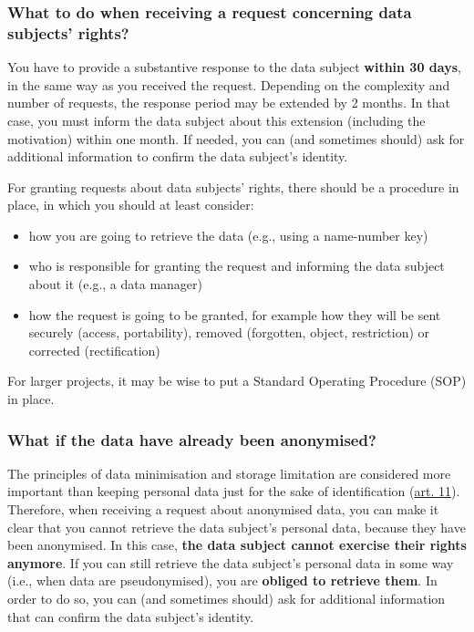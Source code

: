 \documentclass[
]{book}
\providecommand{\tightlist}{%
  \setlength{\itemsep}{0pt}\setlength{\parskip}{0pt}}
\begin{document}
\hypertarget{what-to-do-when-receiving-a-request-concerning-data-subjects-rights}{%
\subsubsection{What to do when receiving a request concerning data subjects' rights?}\label{what-to-do-when-receiving-a-request-concerning-data-subjects-rights}}

You have to provide a substantive response to the data subject \textbf{within 30 days},
in the same way as you received the request. Depending on the complexity and
number of requests, the response period may be extended by 2 months. In that
case, you must inform the data subject about this extension (including the
motivation) within one month. If needed, you can (and sometimes should) ask for
additional information to confirm the data subject's identity.

For granting requests about data subjects' rights, there should be a procedure
in place, in which you should at least consider:

\begin{itemize}
\tightlist
\item
  how you are going to retrieve the data (e.g., using a name-number key)
\item
  who is responsible for granting the request and informing the data subject
  about it (e.g., a data manager)
\item
  how the request is going to be granted, for example how they will be sent
  securely (access, portability), removed (forgotten, object, restriction) or
  corrected (rectification)
\end{itemize}

For larger projects, it may be wise to put a Standard Operating Procedure (SOP)
in place.

\hypertarget{what-if-the-data-have-already-been-anonymised}{%
\subsubsection{What if the data have already been anonymised?}\label{what-if-the-data-have-already-been-anonymised}}

The principles of data minimisation and storage limitation are considered more
important than keeping personal data just for the sake of identification
(\href{https://gdpr-info.eu/art-11-gdpr/}{art. 11}).
Therefore, when receiving a request about anonymised data, you can make it clear
that you cannot retrieve the data subject's personal data, because they have
been anonymised. In this case, \textbf{the data subject cannot exercise their rights
anymore}. If you can still retrieve the data subject's personal data in some
way (i.e., when data are pseudonymised), you are \textbf{obliged to retrieve them}.
In order to do so, you can (and sometimes should) ask for additional information
that can confirm the data subject's identity.
\end{document}

